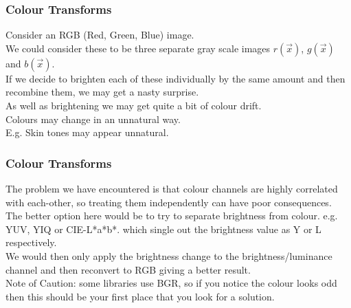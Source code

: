 \begin{frame}\frametitle{ Colour Transforms}
Consider an RGB (Red, Green, Blue) image. \\We could consider these to be three separate gray scale images $r(\vec{x})$, $g(\vec{x})$ and $b(\vec{x})$. \\If we decide to brighten each of these individually by the same amount and then recombine them, we may get a nasty surprise.\\ As well as brightening we may get quite a bit of colour drift. \\Colours may change in an unnatural way. \\E.g. Skin tones may appear unnatural. \\
\end{frame}
\begin{frame}\frametitle{ Colour Transforms}
The problem we have encountered is that colour channels are highly correlated with each-other, so treating them independently can have poor consequences.\\ The better option here would be to try to separate brightness from colour. e.g. YUV, YIQ or CIE-L*a*b*. which single out the brightness value as Y or L respectively.\\ We would then only apply the brightness change to the brightness/luminance channel and then reconvert to RGB giving a better result.\\

Note of Caution: some libraries use BGR, so if you notice the colour looks odd then this should be your first place that you look for a solution.
\end{frame}

